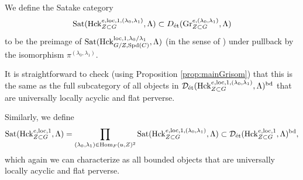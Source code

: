 \begin{defi}\label{defi:satake-category}
   We define the Satake category
    \begin{equation*}
    \textnormal{Sat}(\mathrm{Hck}_{Z \subset G}^{e,\mathrm{loc},1,(\lambda_{0},\lambda_{1})},\Lambda) \subset D_{\textnormal{\'{e}t}}(\textnormal{Gr}_{Z \subset G}^{e,(\lambda_{0},\lambda_{1})},\Lambda)
    \end{equation*}
    to be the preimage of $\textnormal{Sat}(\mathrm{Hck}_{G/Z,\mathrm{Spd}(C)}^{\mathrm{loc},1,\lambda_{0}/\lambda_{1}},\Lambda)$ (in the sense of \cite[Definition VI.7.8]{Geometrization})
    under pullback by the isomorphism $\pi^{(\lambda_{0},\lambda_{1})}$. 
    
    \begin{rque} It is straightforward to check (using Proposition \ref{prop:mainGrisom}) that this is the same as the full subcategory of all objects in $\mathcal{D}_{\textnormal{\'{e}t}}(\mathrm{Hck}_{Z \subset G}^{e,\mathrm{loc},1,(\lambda_{0},\lambda_{1})},\Lambda)^{\textnormal{bd}}$ that are universally locally acyclic and flat perverse. 
    \end{rque}
    
    Similarly, we define
    \begin{equation*}
\textnormal{Sat}(\mathrm{Hck}_{Z \subset G}^{e,\mathrm{loc},1},\Lambda) = \prod_{(\lambda_{0},\lambda_{1}) \in \mathrm{Hom}_{F}(u,Z)^{2}} \textnormal{Sat}(\mathrm{Hck}_{Z \subset G}^{e,\mathrm{loc},1,(\lambda_{0},\lambda_{1})},\Lambda)  \subset \mathcal{D}_{\textnormal{\'{e}t}}(\mathrm{Hck}_{Z \subset G}^{e,\mathrm{loc},1},\Lambda)^{\textnormal{bd}},
    \end{equation*}
    which again we can characterize as all bounded objects that are universally locally acyclic and flat perverse. 
\end{defi}

